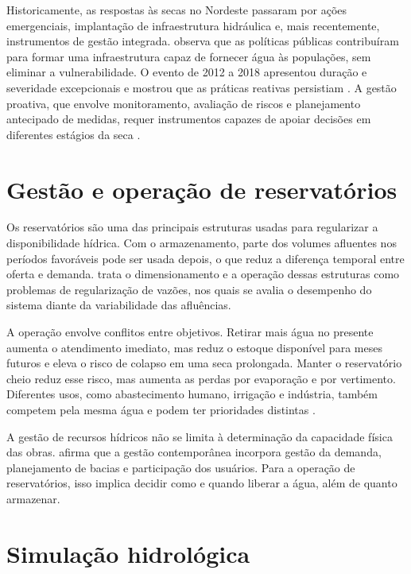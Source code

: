 Historicamente, as respostas às secas no Nordeste passaram por ações emergenciais, implantação de infraestrutura hidráulica e, mais recentemente, instrumentos de gestão integrada.  observa que as políticas públicas contribuíram para formar uma infraestrutura capaz de fornecer água às populações, sem eliminar a vulnerabilidade. O evento de 2012 a 2018 apresentou duração e severidade excepcionais e mostrou que as práticas reativas persistiam \cite{pontesFilho2020}. A gestão proativa, que envolve monitoramento, avaliação de riscos e planejamento antecipado de medidas, requer instrumentos capazes de apoiar decisões em diferentes estágios da seca \cite{deNys2016}.

\section{Gestão e operação de reservatórios}
\label{sec:gestao-reservatorios}

Os reservatórios são uma das principais estruturas usadas para regularizar a disponibilidade hídrica. Com o armazenamento, parte dos volumes afluentes nos períodos favoráveis pode ser usada depois, o que reduz a diferença temporal entre oferta e demanda.  trata o dimensionamento e a operação dessas estruturas como problemas de regularização de vazões, nos quais se avalia o desempenho do sistema diante da variabilidade das afluências.

A operação envolve conflitos entre objetivos. Retirar mais água no presente aumenta o atendimento imediato, mas reduz o estoque disponível para meses futuros e eleva o risco de colapso em uma seca prolongada. Manter o reservatório cheio reduz esse risco, mas aumenta as perdas por evaporação e por vertimento. Diferentes usos, como abastecimento humano, irrigação e indústria, também competem pela mesma água e podem ter prioridades distintas \cite{labadie2004,loucksVanBeek2017}.

A gestão de recursos hídricos não se limita à determinação da capacidade física das obras.  afirma que a gestão contemporânea incorpora gestão da demanda, planejamento de bacias e participação dos usuários. Para a operação de reservatórios, isso implica decidir como e quando liberar a água, além de quanto armazenar.

\section{Simulação hidrológica}
\label{sec:simulacao-hidrologica}

